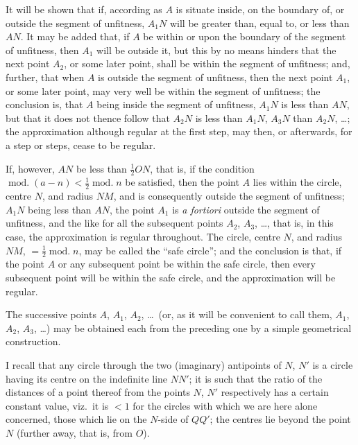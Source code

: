 \documentclass[11pt,a4paper]{book}
\begin{document}
It will be shown that if, according as $A$ is situate inside, on the
boundary of, or outside the segment of unfitness, $A_1N$ will be greater
than, equal to, or less than $AN$. It may be added that, if $A$ be within
or upon the boundary of the segment of unfitness, then $A_1$ will be outside
it, but this by no means hinders that the next point $A_2$, or some later
point, shall be within the segment of unfitness; and, further, that when
$A$ is outside the segment of unfitness, then the next point $A_1$, or some
later point, may very well be within the segment of unfitness; the
conclusion is, that $A$ being inside the segment of unfitness, $A_1N$ is less
than $AN$, but that it does not thence follow that $A_2N$ is less than $A_1N$,
$A_3N$ than $A_2N$, \dots; the approximation although regular at the first
step, may then, or afterwards, for a step or steps, cease to be regular.

If, however, $AN$ be less than $\frac{1}{2}ON$, that is, if the condition
$\operatorname{mod.}(a-n)<\frac{1}{2}\operatorname{mod.}n$ be satisfied, then the point $A$ lies
within the circle, centre $N$, and radius $NM$, and is consequently outside
the segment of unfitness; $A_1N$ being less than $AN$, the point $A_1$ is
\textit{a fortiori} outside the segment of unfitness, and the like for all the
subsequent points $A_2$, $A_3$, \dots, that is, in this case, the approximation
is regular throughout. The circle, centre $N$, and radius $NM$, $=\frac{1}{2}\operatorname{mod.}n$,
may be called the ``safe circle''; and the conclusion is that, if the point
$A$ or any subsequent point be within the safe circle, then every subsequent
point will be within the safe circle, and the approximation will be regular.

The successive points $A$, $A_1$, $A_2$, \dots\ (or, as it will be convenient to
call them, $A_1$, $A_2$, $A_3$, \dots) may be obtained each from the preceding
one by a simple geometrical construction.

I recall that any circle through the two (imaginary) antipoints of
$N$, $N'$ is a circle having its centre on the indefinite line $NN'$; it is such
that the ratio of the distances of a point thereof from the points $N$, $N'$
respectively has a certain constant value, viz.~it is $<1$ for the circles
with which we are here alone concerned, those which lie on the $N$-side
of $QQ'$; the centres lie beyond the point $N$ (further away, that is, from
$O$).
\end{document}
